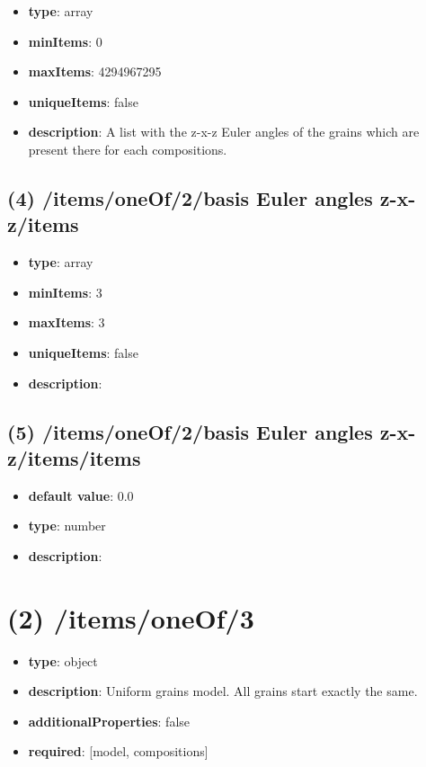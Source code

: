 \begin{itemize}[leftmargin=3em]\item {\bf type}: array
\item {\bf minItems}: 0
\item {\bf maxItems}: 4294967295
\item {\bf uniqueItems}: false
\item {\bf description}: A list with the z-x-z Euler angles of the grains which are present there for each compositions.
\end{itemize}\subsection{(4) /items/oneOf/2/basis Euler angles z-x-z/items}
\begin{itemize}[leftmargin=4em]\item {\bf type}: array
\item {\bf minItems}: 3
\item {\bf maxItems}: 3
\item {\bf uniqueItems}: false
\item {\bf description}: 
\end{itemize}\subsection{(5) /items/oneOf/2/basis Euler angles z-x-z/items/items}
\begin{itemize}[leftmargin=5em]\item {\bf default value}: 0.0
\item {\bf type}: number
\item {\bf description}: 
\end{itemize}\section{(2) /items/oneOf/3}
\begin{itemize}[leftmargin=2em]\item {\bf type}: object
\item {\bf description}: Uniform grains model. All grains start exactly the same.
\item {\bf additionalProperties}: false
\item {\bf required}: [model, compositions]\end{itemize}
